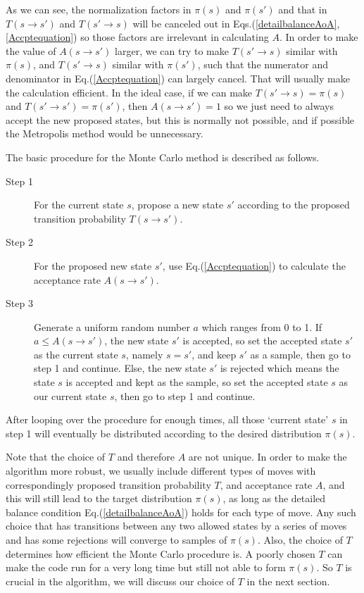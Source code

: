 \documentclass[12pt,letterpaper,UTF8]{report}
\begin{document}
As we can see, the normalization factors in $\pi(s)$ and $\pi(s')$ and that in $T(s \rightarrow s')$ and $T(s'\rightarrow s)$ will be canceled out in Eqs.(\ref{detailbalanceAoA},\ref{Accptequation}) so those factors are irrelevant in calculating $A$. In order to make the value of $A(s\rightarrow s')$ larger, we can try to make $T(s'\rightarrow s)$ similar with $\pi(s)$, and $T(s'\rightarrow s)$ similar with $\pi(s')$, such that the numerator and denominator in Eq.(\ref{Accptequation}) can largely cancel. That will usually make the calculation efficient. In the ideal case, if we can make $T(s'\rightarrow s)=\pi(s)$ and $T(s'\rightarrow s')=\pi(s')$, then $A(s\rightarrow s')=1$ so we just need to always accept the new proposed states, but this is normally not possible, and if possible the Metropolis method would be unnecessary.

The basic procedure for the Monte Carlo method is described as follows.
\begin{description}
  \item[Step 1] For the current state $s$, propose a new state $s'$ according to the proposed transition probability $T(s\rightarrow s')$.
  \item[Step 2] For the proposed new state $s'$, use Eq.(\ref{Accptequation}) to calculate the acceptance rate $A(s\rightarrow s')$.
  \item[Step 3] Generate a uniform random number $a$ which ranges from 0 to 1.
  If $a \leq A(s\rightarrow s')$, the new state $s'$ is accepted, so set the accepted state $s'$ as the current state $s$, namely $s = s'$, and keep $s'$ as a sample, then go to step 1 and continue. Else, the new state $s'$ is rejected which means the state $s$ is accepted and kept as the sample, so set the accepted state $s$ as our current state $s$, then go to step 1 and continue.
\end{description}

After looping over the procedure for enough times, all those `current state' $s$ in step 1 will eventually be distributed according to the desired distribution $\pi(s)$.

Note that the choice of $T$ and therefore $A$ are not unique.
In order to make the algorithm more robust,
we usually include different types of moves with correspondingly proposed transition probability $T$, and acceptance rate $A$,
and this will still lead to the target distribution $\pi(s)$,
as long as the detailed balance condition Eq.(\ref{detailbalanceAoA}) holds for each type of move.
Any such choice that has transitions between any two allowed states by a series of moves and has some rejections will converge to samples of $\pi(s)$.
Also, the choice of $T$ determines how efficient the Monte Carlo procedure is. A poorly chosen $T$ can make the code run for a very long time but still not able to form $\pi(s)$. So $T$ is crucial in the algorithm, we will discuss our choice of $T$ in the next section.
\end{document}
